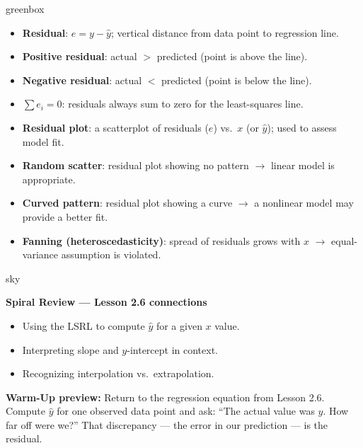 \documentclass[10pt]{article}
\begin{document}
\begin{skillbox}{greenbox}
\begin{minipage}[t]{0.48\linewidth}
    \begin{itemize}
        \item \textbf{Residual}: $e = y - \hat{y}$; vertical distance from data point to
              regression line.
        \item \textbf{Positive residual}: actual $>$ predicted (point is above the line).
        \item \textbf{Negative residual}: actual $<$ predicted (point is below the line).
        \item \textbf{$\sum e_i = 0$}: residuals always sum to zero for the least-squares line.
    \end{itemize}
\end{minipage}
\hfill
\begin{minipage}[t]{0.48\linewidth}
    \begin{itemize}
        \item \textbf{Residual plot}: a scatterplot of residuals ($e$) vs.\ $x$ (or $\hat{y}$);
              used to assess model fit.
        \item \textbf{Random scatter}: residual plot showing no pattern $\to$ linear model
              is appropriate.
        \item \textbf{Curved pattern}: residual plot showing a curve $\to$ a nonlinear model
              may provide a better fit.
        \item \textbf{Fanning (heteroscedasticity)}: spread of residuals grows with $x$ $\to$
              equal-variance assumption is violated.
    \end{itemize}
\end{minipage}
\end{skillbox}

\begin{fixedskillbox}{sky}
\begin{minipage}[t]{0.60\linewidth}
    \textbf{Spiral Review --- Lesson 2.6 connections}
    \begin{itemize}
        \item Using the LSRL to compute $\hat{y}$ for a given $x$ value.
        \item Interpreting slope and $y$-intercept in context.
        \item Recognizing interpolation vs.\ extrapolation.
    \end{itemize}
    \medskip
    \textbf{Warm-Up preview:} Return to the regression equation from Lesson 2.6. Compute
    $\hat{y}$ for one observed data point and ask: ``The actual value was $y$. How far off were
    we?'' That discrepancy --- the error in our prediction --- is the residual.
\end{minipage}
\end{fixedskillbox}
\end{document}
